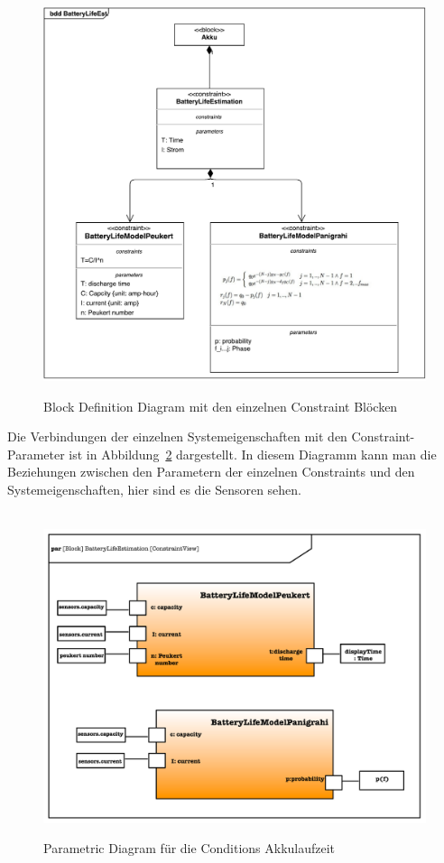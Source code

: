 \begin{figure}[h]
\centering\
\includegraphics[width=14cm]{img/batterybdd}
\caption{Block Definition Diagram mit den einzelnen Constraint Blöcken}
\label{fig:blockBattery}
\end{figure}

Die Verbindungen der einzelnen Systemeigenschaften mit den Constraint-Parameter ist in
Abbildung~\ref{fig:parBattery} dargestellt.
In diesem Diagramm kann man die Beziehungen zwischen den Parametern der einzelnen Constraints und den Systemeigenschaften, hier sind es die Sensoren sehen.

\begin{figure}[h]
\centering\
\includegraphics[width=14cm]{img/batteryParametric}
\caption{Parametric Diagram für die Conditions Akkulaufzeit}
\label{fig:parBattery}
\end{figure}


